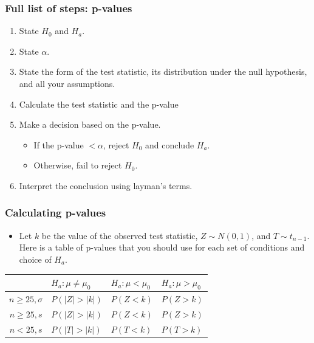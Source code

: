 \documentclass[handout]{beamer}\usepackage[]{graphicx}\usepackage[]{color}
\providecommand{\q}{$\quad$ \newline}
\numberwithin{equation}{section}
\begin{document}
\begin{frame}
\frametitle{Full list of steps: p-values}
\begin{enumerate}[1. ]
\item State $H_0$ and $H_a$.
\pause \item State $\alpha$.
\pause \item State the form of the test statistic, its distribution under the null hypothesis, and all your assumptions.
\pause \item Calculate the test statistic and the p-value
\pause \item Make a decision based on the p-value.
\begin{itemize}
\pause \item If the p-value $< \alpha$, reject $H_0$ and conclude $H_a$.
\pause \item Otherwise, fail to reject $H_0$.
\end{itemize}
\pause \item Interpret the conclusion using layman's terms.
\end{enumerate}
\end{frame}

\begin{frame}
\frametitle{Calculating p-values}
\begin{itemize}
\pause \item Let $k$ be the value of the observed test statistic, $Z \sim N(0,1)$, and $T \sim t_{n-1}$. Here is a table of p-values that you should use for each set of conditions and choice of $H_a$. \q
\end{itemize}
\pause \begin{tabular}{c|lll}
 & $H_a: \mu \ne \mu_0$ & $H_a: \mu < \mu_0$ & $H_a: \mu > \mu_0$  \\ \hline
$n \ge 25, \sigma$ & $P(|Z| > |k|)$ & $P(Z < k)$ & $P(Z > k)$ \\ [2.5ex]
$n \ge 25, s$ & $P(|Z| > |k|)$           & $P(Z < k)$ & $P(Z > k)$\\ [2.5ex]
$n < 25, s$    & $P(|T| > |k|)$           & $P(T < k)$ & $P(T > k)$   \\ [2.5ex]
\end{tabular}
\end{frame}
\end{document}
